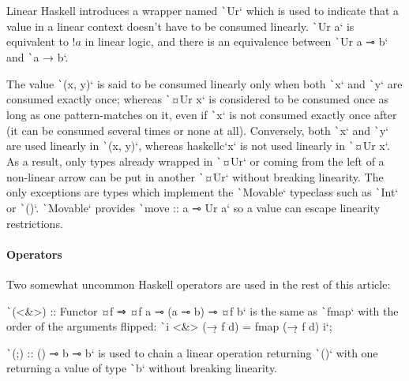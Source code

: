 \documentclass[english]{jflart}
\begin{document}
Linear Haskell introduces a wrapper named \texttt`Ur` which is used to indicate that a value in a linear context doesn't have to be consumed linearly. \texttt`Ur a` is equivalent to $!a$ in linear logic, and there is an equivalence between \texttt`Ur a ⊸ b` and \texttt`a → b`.

The value \texttt`(x, y)` is said to be consumed linearly only when both \texttt`x` and \texttt`y` are consumed exactly once; whereas \texttt`¤Ur x` is considered to be consumed once as long as one pattern-matches on it, even if \texttt`x` is not consumed exactly once after (it can be consumed several times or none at all). Conversely, both \texttt`x` and \texttt`y` are used linearly in \texttt`(x, y)`, whereas {haskellc}`x` is not used linearly in \texttt`¤Ur x`. As a result, only types already wrapped in \texttt`¤Ur` or coming from the left of a non-linear arrow can be put in another \texttt`¤Ur` without breaking linearity. The only exceptions are types which implement the \texttt`Movable` typeclass such as \texttt`Int` or \texttt`()`. \texttt`Movable` provides \texttt`move :: a ⊸ Ur a` so a value can escape linearity restrictions.


\paragraph{Operators}

Two somewhat uncommon Haskell operators are used in the rest of this article:

\texttt`(<&>) :: Functor ¤f ⇒ ¤f a ⊸ (a ⊸ b) ⊸ ¤f b` is the same as \texttt`fmap` with the order of the arguments flipped: \texttt`i <&> (\d → f d) = fmap (\d → f d) i`;%

\texttt`(;) :: () ⊸ b ⊸ b` is used to chain a linear operation returning \texttt`()` with one returning a value of type \texttt`b` without breaking linearity.
\end{document}
